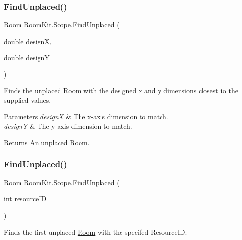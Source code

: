 \subsubsection{\texorpdfstring{Find\+Unplaced()}{FindUnplaced()}\hspace{0.1cm}{\footnotesize\ttfamily [2/3]}}
{\footnotesize\ttfamily \mbox{\hyperlink{class_room_kit_1_1_room}{Room}} Room\+Kit.\+Scope.\+Find\+Unplaced (\begin{DoxyParamCaption}\item[{double}]{designX,  }\item[{double}]{designY }\end{DoxyParamCaption})}



Finds the unplaced \mbox{\hyperlink{class_room_kit_1_1_room}{Room}} with the designed x and y dimensions closest to the supplied values. 


\begin{DoxyParams}{Parameters}
{\em designX} & The x-\/axis dimension to match.\\
\hline
{\em designY} & The y-\/axis dimension to match.\\
\hline
\end{DoxyParams}
\begin{DoxyReturn}{Returns}
An unplaced \mbox{\hyperlink{class_room_kit_1_1_room}{Room}}. 
\end{DoxyReturn}
\mbox{\label{class_room_kit_1_1_scope_a59398f2335bda913a9f8ebb5f212fc06}} 
\subsubsection{\texorpdfstring{Find\+Unplaced()}{FindUnplaced()}\hspace{0.1cm}{\footnotesize\ttfamily [3/3]}}
{\footnotesize\ttfamily \mbox{\hyperlink{class_room_kit_1_1_room}{Room}} Room\+Kit.\+Scope.\+Find\+Unplaced (\begin{DoxyParamCaption}\item[{int}]{resource\+ID }\end{DoxyParamCaption})}



Finds the first unplaced \mbox{\hyperlink{class_room_kit_1_1_room}{Room}} with the specifed Resource\+ID. 


